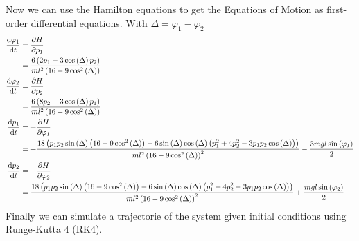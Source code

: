 \documentclass{article}
\begin{document}
\newpage
\noindent Now we can use the Hamilton equations to get the Equations of Motion as first-order differential equations. With $\Delta =\varphi_1-\varphi_2$
\begin{align}
	\dv{\varphi_1}{t} &= \pdv{H}{p_1}\\
	&= \frac{6\left(2p_1-3\cos\left(\Delta\right)p_2\right)}{ml^2\left(16-9\cos^2\left(\Delta\right)\right)}\\
	\dv{\varphi_2}{t} &= \pdv{H}{p_2}\\
	&=\frac{6\left(8p_2-3\cos\left(\Delta\right)p_1\right)}{ml^2\left(16-9\cos^2\left(\Delta\right)\right)}\\
	\dv{p_1}{t} &= -\pdv{H}{\varphi_1}\\
	&=-\frac{18\left(p_1p_2\sin\left(\Delta\right)\left(16-9\cos^2\left(\Delta\right)\right)-6\sin\left(\Delta\right)\cos\left(\Delta\right)\left(p_1^2+4p_2^2-3p_1p_2\cos\left(\Delta\right)\right)\right)}{ml^2\left(16-9\cos^2\left(\Delta\right)\right)^2}-\frac{3mgl\sin\left(\varphi_1\right)}{2}\\
	\dv{p_2}{t} &= -\pdv{H}{\varphi_2}\\
	&=\frac{18\left(p_1p_2\sin\left(\Delta\right)\left(16-9\cos^2\left(\Delta\right)\right)-6\sin\left(\Delta\right)\cos\left(\Delta\right)\left(p_1^2+4p_2^2-3p_1p_2\cos\left(\Delta\right)\right)\right)}{ml^2\left(16-9\cos^2\left(\Delta\right)\right)^2}+\frac{mgl\sin\left(\varphi_2\right)}{2}
\end{align}
Finally we can simulate a trajectorie of the system given initial conditions using Runge-Kutta 4 (RK4).

\end{document}
